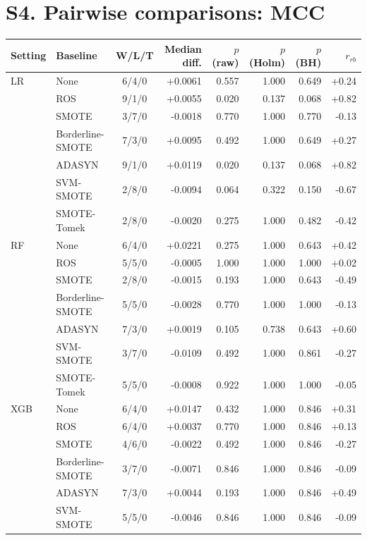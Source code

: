 \documentclass[10pt,a4paper]{article}
\begin{document}
\section*{S4. Pairwise comparisons: MCC}
\begin{center}\footnotesize\begin{longtable}{@{}llcrrrrr@{}}\toprule Setting & Baseline & W/L/T & Median diff. & $p$ (raw) & $p$ (Holm) & $p$ (BH) & $r_{rb}$ \\ \midrule\endhead
LR & None & 6/4/0 & +0.0061 & 0.557 & 1.000 & 0.649 & +0.24 \\
 & ROS & 9/1/0 & +0.0055 & 0.020 & 0.137 & 0.068 & +0.82 \\
 & SMOTE & 3/7/0 & -0.0018 & 0.770 & 1.000 & 0.770 & -0.13 \\
 & Borderline-SMOTE & 7/3/0 & +0.0095 & 0.492 & 1.000 & 0.649 & +0.27 \\
 & ADASYN & 9/1/0 & +0.0119 & 0.020 & 0.137 & 0.068 & +0.82 \\
 & SVM-SMOTE & 2/8/0 & -0.0094 & 0.064 & 0.322 & 0.150 & -0.67 \\
 & SMOTE-Tomek & 2/8/0 & -0.0020 & 0.275 & 1.000 & 0.482 & -0.42 \\
\midrule
RF & None & 6/4/0 & +0.0221 & 0.275 & 1.000 & 0.643 & +0.42 \\
 & ROS & 5/5/0 & -0.0005 & 1.000 & 1.000 & 1.000 & +0.02 \\
 & SMOTE & 2/8/0 & -0.0015 & 0.193 & 1.000 & 0.643 & -0.49 \\
 & Borderline-SMOTE & 5/5/0 & -0.0028 & 0.770 & 1.000 & 1.000 & -0.13 \\
 & ADASYN & 7/3/0 & +0.0019 & 0.105 & 0.738 & 0.643 & +0.60 \\
 & SVM-SMOTE & 3/7/0 & -0.0109 & 0.492 & 1.000 & 0.861 & -0.27 \\
 & SMOTE-Tomek & 5/5/0 & -0.0008 & 0.922 & 1.000 & 1.000 & -0.05 \\
\midrule
XGB & None & 6/4/0 & +0.0147 & 0.432 & 1.000 & 0.846 & +0.31 \\
 & ROS & 6/4/0 & +0.0037 & 0.770 & 1.000 & 0.846 & +0.13 \\
 & SMOTE & 4/6/0 & -0.0022 & 0.492 & 1.000 & 0.846 & -0.27 \\
 & Borderline-SMOTE & 3/7/0 & -0.0071 & 0.846 & 1.000 & 0.846 & -0.09 \\
 & ADASYN & 7/3/0 & +0.0044 & 0.193 & 1.000 & 0.846 & +0.49 \\
 & SVM-SMOTE & 5/5/0 & -0.0046 & 0.846 & 1.000 & 0.846 & -0.09 \\

\end{longtable}
\end{center}
\end{document}
